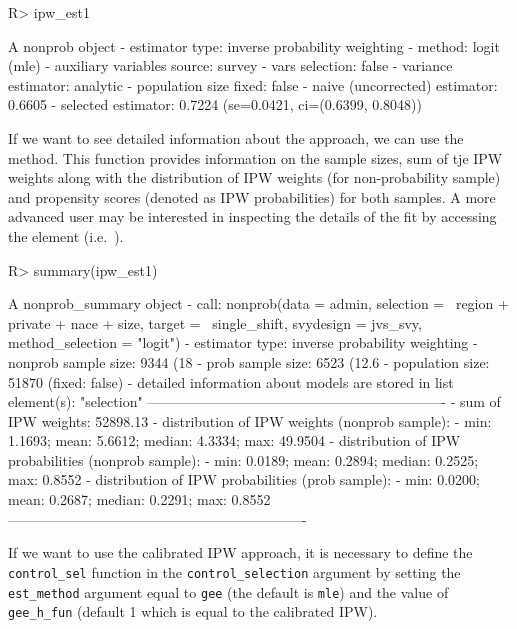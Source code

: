 \documentclass[
]{jss}
\begin{document}
\begin{CodeChunk}
\begin{CodeInput}
R> ipw_est1
\end{CodeInput}
\begin{CodeOutput}
A nonprob object
 - estimator type: inverse probability weighting
 - method: logit (mle)
 - auxiliary variables source: survey
 - vars selection: false
 - variance estimator: analytic
 - population size fixed: false
 - naive (uncorrected) estimator: 0.6605
 - selected estimator: 0.7224 (se=0.0421, ci=(0.6399, 0.8048))
\end{CodeOutput}
\end{CodeChunk}

If we want to see detailed information about the approach, we can use
the  method. This function provides information on the
sample sizes, sum of tje IPW weights along with the distribution of IPW
weights (for non-probability sample) and propensity scores (denoted as
IPW probabilities) for both samples. A more advanced user may be
interested in inspecting the details of the fit by accessing the
 element (i.e.~).

\begin{CodeChunk}
\begin{CodeInput}
R> summary(ipw_est1)
\end{CodeInput}
\begin{CodeOutput}
A nonprob_summary object
 - call: nonprob(data = admin, selection = ~region + private + nace + 
    size, target = ~single_shift, svydesign = jvs_svy, method_selection = "logit")
 - estimator type: inverse probability weighting
 - nonprob sample size: 9344 (18%
 - prob sample size: 6523 (12.6%
 - population size: 51870 (fixed: false)
 - detailed information about models are stored in list element(s): "selection"
----------------------------------------------------------------
 - sum of IPW weights: 52898.13 
 - distribution of IPW weights (nonprob sample):
   - min: 1.1693; mean: 5.6612; median: 4.3334; max: 49.9504
 - distribution of IPW probabilities (nonprob sample):
   - min: 0.0189; mean: 0.2894; median: 0.2525; max: 0.8552
 - distribution of IPW probabilities (prob sample):
   - min: 0.0200; mean: 0.2687; median: 0.2291; max: 0.8552
----------------------------------------------------------------
\end{CodeOutput}
\end{CodeChunk}

If we want to use the calibrated IPW approach, it is necessary to define
the \texttt{control\_sel} function in the \texttt{control\_selection}
argument by setting the \texttt{est\_method} argument equal to
\texttt{gee} (the default is \texttt{mle}) and the value of
\texttt{gee\_h\_fun} (default 1 which is equal to the calibrated IPW).
\end{document}
